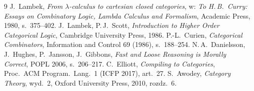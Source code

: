 \makeatletter
\begingroup
\renewcommand*{\bib@heading}{\subsection*{Literatura}}
\begin{thebibliography}{9}\small
{} J.~Lambek, \emph{From $\lambda$-calculus to cartesian closed categories}, w: \emph{To H.\,B.~Curry: Essays on Combinatory Logic, Lambda Calculus and Formalism}, Academic Press, 1980, s.~375--402.
 J.~Lambek, P.\,J.~Scott, \emph{Introduction to Higher Order Categorical Logic}, Cambridge University Press, 1986.
 P.-L.~Curien, \emph{Categorical Combinators}, Information and Control 69 (1986), s.~188--254.
 N.\,A.~Danielsson, J.~Hughes, P.~Jansson, J.~Gibbons, \emph{Fast and Loose Reasoning is Morally Correct}, POPL 2006, s.~206--217.
 C.~Elliott, \emph{Compiling to Categories}, Proc.\ ACM Program.\ Lang.\ 1 (ICFP 2017), art.~27.
 S.~Awodey, \emph{Category Theory}, wyd.~2, Oxford University Press, 2010, rozdz.~6.
\end{thebibliography}
\endgroup
\makeatother
